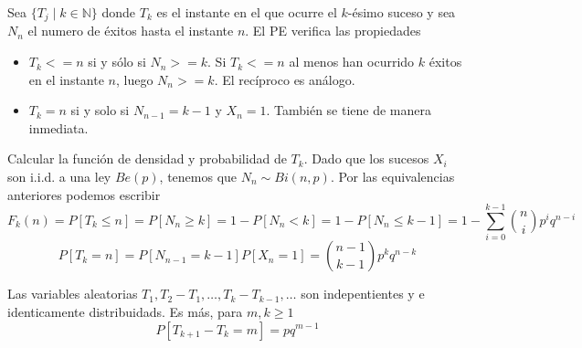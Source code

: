 \documentclass[PREyA.tex]{subfiles}
\begin{document}
\begin{defi}
Sea $\{T_j \mid k \in \mathbb{N}\}$ donde $T_k$ es el instante en el que ocurre el $k$-ésimo suceso y sea $N_n$ el numero de éxitos hasta el instante $n$. El PE verifica las propiedades
\begin{itemize}
\item $T_k <= n$ si y sólo si $ N_n >= k$. Si $T_k <= n$ al menos han ocurrido $k$ éxitos en el instante $n$, luego $N_n >= k$. El recíproco es análogo.
\item $T_k = n$ si y solo si $N_{n-1} = k-1$ y $X_n = 1$. También se tiene de manera inmediata.
\end{itemize}
\end{defi}
\begin{example} Calcular la función de densidad y probabilidad de $T_k$. Dado que los sucesos $X_i$ son i.i.d. a una ley $Be(p)$, tenemos que $N_n \sim Bi(n,p)$. Por las equivalencias anteriores podemos escribir
$$
F_k(n) = P[T_k \leq n ] = P[N_n \geq k] = 1 - P[N_n < k] = 1 - P[N_n \leq k -1] = 1- \sum_{i=0}^{k-1}\binom{n}{i}p^iq^{n-i}
$$
$$
P[T_k = n] = P[N_{n-1} =k-1]P[X_n = 1] = \binom{n-1}{k-1}p^kq^{n-k}
$$
\end{example}
\begin{prop}
Las variables aleatorias $T_1, T_2-T_1,\dotsc,T_k-T_{k-1},\dotsc$ son indepentientes y e identicamente distribuidads. Es más, para $m,k\geq 1$ 
$$
P[T_{k+1} - T_k = m] = pq^{m-1}
$$
\end{prop}
\end{document}
